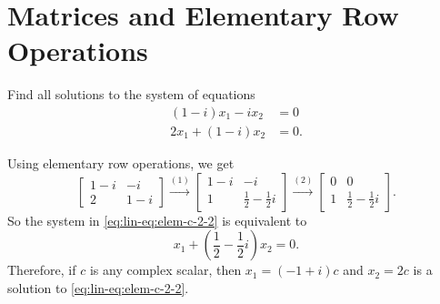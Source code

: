\section{Matrices and Elementary Row Operations}

 Find all solutions to the system of equations
\begin{equation}
  \label{eq:lin-eq:elem-c-2-2}
  \begin{split}
    (1 - i)x_1 - ix_2 &= 0 \\
    2x_1 + (1 - i)x_2 &= 0.
  \end{split}
\end{equation}
\begin{solution}
  Using elementary row operations, we get
  \begin{equation*}
    \begin{bmatrix}
      1 - i & -i \\
      2 & 1 - i
    \end{bmatrix}
    \xrightarrow{(1)}
    \begin{bmatrix}
      1 - i & -i \\
      1 & \frac12 - \frac12i
    \end{bmatrix}
    \xrightarrow{(2)}
    \begin{bmatrix}
      0 & 0 \\
      1 & \frac12 - \frac12i
    \end{bmatrix}.
  \end{equation*}
  So the system in \eqref{eq:lin-eq:elem-c-2-2} is equivalent to
  \begin{equation*}
    x_1 + \left(\frac12 - \frac12i\right)x_2 = 0.
  \end{equation*}
  Therefore, if $c$ is any complex scalar, then $x_1 = (-1 + i)c$ and
  $x_2 = 2c$ is a solution to \eqref{eq:lin-eq:elem-c-2-2}.
\end{solution}

